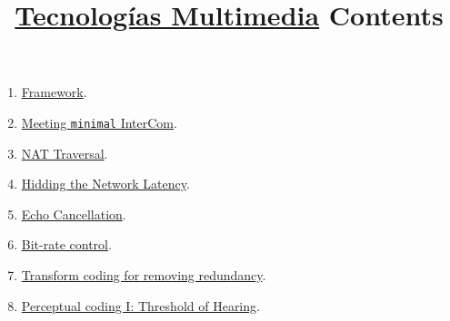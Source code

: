 
\title{\href{https://tecnologias-multimedia.github.io/}{Tecnologías Multimedia} \newline Contents}

\maketitle

\begin{enumerate}
\item \href{https://tecnologias-multimedia.github.io/contents/framework/}{Framework}. %
\item \href{https://tecnologias-multimedia.github.io/contents/minimal/}{Meeting \texttt{minimal} InterCom}. %
\item \href{https://tecnologias-multimedia.github.io/contents/NAT_traversal/}{NAT Traversal}. %
\item \href{https://tecnologias-multimedia.github.io/contents/latency/}{Hidding the Network Latency}. %
\item \href{https://tecnologias-multimedia.github.io/contents/echo_cancellation/}{Echo Cancellation}. %
\item \href{https://tecnologias-multimedia.github.io/contents/BR_control/}{Bit-rate control}. %
\item \href{https://tecnologias-multimedia.github.io/contents/transform_coding/}{Transform coding for removing redundancy}. %
\item \href{https://tecnologias-multimedia.github.io/contents/threshold_of_hearing/}{Perceptual coding I: Threshold of Hearing}.
\end{enumerate}



